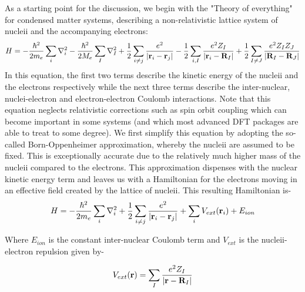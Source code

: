 \documentclass[10pt]{ruthesis}
\begin{document}
As a starting point for the discussion, we begin with the "Theory of everything" for condensed matter systems, describing a non-relativistic lattice system of nucleii and the accompanying electrons:
\begin{equation}\label{DFT_1}
H=-\dfrac{\hbar^2}{2m_e}\sum_i\nabla_i^2  -\dfrac{\hbar^2}{2M_e}\sum_I\nabla_I^2 +\dfrac{1}{2}\sum_{i\neq j} \dfrac{e^2}{|\mathbf{r}_i -\mathbf{r}_j|}-\dfrac{1}{2}\sum_{i, I} \dfrac{e^2Z_I}{|\mathbf{r}_i -\mathbf{R}_I|} + \dfrac{1}{2}\sum_{I\neq J} \dfrac{e^2Z_I Z_J}{|\mathbf{R}_I -\mathbf{R}_J|} 
\end{equation}
In this equation, the first two terms describe the kinetic energy of the nucleii and the electrons respectively while the next three terms describe the inter-nuclear, nuclei-electron and electron-electron Coulomb interactions. Note that this equation neglects relativistic corrections such as spin orbit coupling which can become important in some systems (and which most advanced DFT packages are able to treat to some degree). We first simplify this equation by adopting the so-called Born-Oppenheimer approximation, whereby the nucleii are assumed to be fixed. This is exceptionally accurate due to the relatively much higher mass of the nucleii compared to the electrons. This approximation dispenses with the nuclear kinetic energy term and leaves us with a Hamiltonian for the electrons moving in an effective field created by the lattice of nucleii. This resulting Hamiltonian is-
\begin{equation}\label{DFT_2}
H=-\dfrac{\hbar^2}{2m_e}\sum_i\nabla_i^2 + \dfrac{1}{2}\sum_{i\neq j} \dfrac{e^2}{|\mathbf{r}_i -\mathbf{r}_j|} +\sum_i V_{ext}(\mathbf{r}_i) +E_{ion}
\end{equation}

Where $E_{ion}$ is the constant inter-nuclear Coulomb term and $V_{ext}$ is the nucleii-electron repulsion given by-

\begin{equation}
 V_{ext}(\mathbf{r})= \sum_{I} \dfrac{e^2 Z_I}{|\mathbf{r}-\mathbf{R}_I|}
 \end{equation} 
\end{document}

